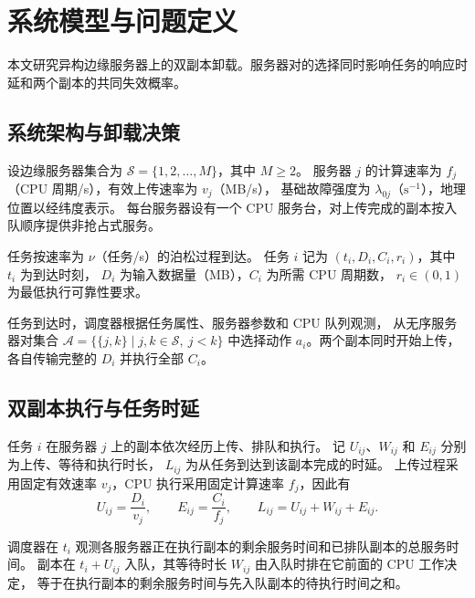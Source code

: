 \documentclass[UTF8,fontset=fandol]{ctexart}
\begin{document}
\setcounter{section}{2}

\section{系统模型与问题定义}
\label{sec:system-model}

本文研究异构边缘服务器上的双副本卸载。服务器对的选择同时影响任务的响应时延和两个副本的共同失效概率。

\subsection{系统架构与卸载决策}
\label{sec:system-architecture}

设边缘服务器集合为 \(\mathcal{S}=\{1,2,\ldots,M\}\)，其中 \(M\geq 2\)。
服务器 \(j\) 的计算速率为 \(f_j\)（CPU 周期/s），有效上传速率为 \(v_j\)（MB/s），
基础故障强度为 \(\lambda_{0j}\)（\(\mathrm{s}^{-1}\)），地理位置以经纬度表示。
每台服务器设有一个 CPU 服务台，对上传完成的副本按入队顺序提供非抢占式服务。

任务按速率为 \(\nu\)（任务/s）的泊松过程到达。
任务 \(i\) 记为 \((t_i,D_i,C_i,r_i)\)，其中 \(t_i\) 为到达时刻，
\(D_i\) 为输入数据量（MB），\(C_i\) 为所需 CPU 周期数，
\(r_i\in(0,1)\) 为最低执行可靠性要求。

任务到达时，调度器根据任务属性、服务器参数和 CPU 队列观测，
从无序服务器对集合 \(\mathcal{A}=\{\{j,k\}\mid j,k\in\mathcal{S},\ j<k\}\)
中选择动作 \(a_i\)。两个副本同时开始上传，各自传输完整的 \(D_i\) 并执行全部 \(C_i\)。

\subsection{双副本执行与任务时延}
\label{sec:replica-delay}

任务 \(i\) 在服务器 \(j\) 上的副本依次经历上传、排队和执行。
记 \(U_{ij}\)、\(W_{ij}\) 和 \(E_{ij}\) 分别为上传、等待和执行时长，
\(L_{ij}\) 为从任务到达到该副本完成的时延。
上传过程采用固定有效速率 \(v_j\)，CPU 执行采用固定计算速率 \(f_j\)，因此有
\begin{equation}
  U_{ij}=\frac{D_i}{v_j},\qquad
  E_{ij}=\frac{C_i}{f_j},\qquad
  L_{ij}=U_{ij}+W_{ij}+E_{ij}.
  \label{eq:replica-delay}
\end{equation}

调度器在 \(t_i\) 观测各服务器正在执行副本的剩余服务时间和已排队副本的总服务时间。
副本在 \(t_i+U_{ij}\) 入队，其等待时长 \(W_{ij}\) 由入队时排在它前面的 CPU 工作决定，
等于在执行副本的剩余服务时间与先入队副本的待执行时间之和。
\end{document}
